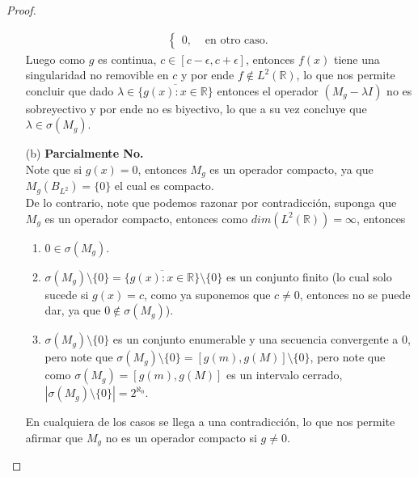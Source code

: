 \begin{proof}
\begin{enumerate}
\begin{align*}
\begin{cases}
          0, &\text{ en otro caso}.
        \end{cases}
      \end{align*}
      Luego como $g$ es continua, $c\in [c-\epsilon,c+\epsilon]$, entonces $f(x)$ tiene una singularidad no removible en $c$ y por ende $f\notin L^2(\mathbb{R})$, lo que nos permite concluir que dado $\lambda\in \overline{\{g(x):x\in\mathbb{R}\}}$ entonces el operador $(M_{g}-\lambda I)$ no es sobreyectivo y por ende no es biyectivo, lo que a su vez concluye que $\lambda\in \sigma(M_{g})$. 
    \item[(b)]
      \textbf{Parcialmente No.}\\
      Note que si $g(x)=0$, entonces $M_{g}$ es un operador compacto, ya que $M_{g}(B_{L^2})=\{0\}$ el cual es compacto.\\
      De lo contrario, note que podemos razonar por contradicción, suponga que $M_{g}$ es un operador compacto, entonces como $dim(L^2(\mathbb{R}))=\infty$, entonces
      \begin{enumerate}
        \item $0\in \sigma(M_{g})$.
        \item $\sigma(M_{g})\setminus \{0\}=\overline{\{g(x):x\in\mathbb{R}\}}\setminus \{0\}$ es un conjunto finito (lo cual solo sucede si $g(x)=c$, como ya suponemos que $c\neq 0$, entonces no se puede dar, ya que $0\notin \sigma(M_{g})$).
        \item $\sigma(M_{g})\setminus \{0\}$ es un conjunto enumerable y una secuencia convergente a $0$, pero note que $\sigma(M_{g})\setminus \{0\}=[g(m),g(M)]\setminus \{0\}$, pero note que como $\sigma(M_{g})=[g(m),g(M)]$ es un intervalo cerrado, $|\sigma(M_{g})\setminus \{0\}|=2^{\aleph_{0}}$.
      \end{enumerate}
      En cualquiera de los casos se llega a una contradicción, lo que nos permite afirmar que $M_{g}$ no es un operador compacto si $g\neq 0$. 
  \end{enumerate}
\end{proof}
